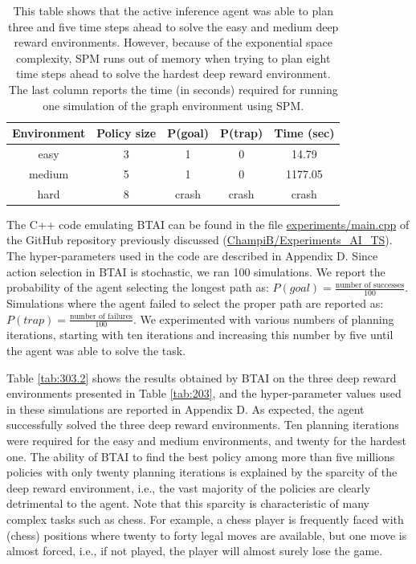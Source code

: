 \documentclass[twoside,11pt]{article}
\begin{document}
\begin{table}[H]
\centering
\begin{tabular}{ |c|c|c|c|c|}
 \hline
 Environment & Policy size & P(goal) & P(trap) & Time (sec)\\
 \hline
 easy & 3 & 1 & 0 & 14.79\\
 medium & 5 & 1 & 0 & 1177.05\\
 hard & 8 & crash & crash & crash \\
 \hline
\end{tabular}
\caption{This table shows that the active inference agent was able to plan three and five time steps ahead to solve the easy and medium deep reward environments. However, because of the exponential space complexity, SPM runs out of memory when trying to plan eight time steps ahead to solve the hardest deep reward environment. The last column reports the time (in seconds) required for running one simulation of the graph environment using SPM.}
\label{tab:303.1}
\end{table}

The C++ code emulating BTAI can be found in the file \url{experiments/main.cpp} of the GitHub repository previously discussed (\url{ChampiB/Experiments_AI_TS}). The hyper-parameters used in the code are described in Appendix D. Since action selection in BTAI is stochastic, we ran 100 simulations. We report the probability of the agent selecting the longest path as: $P(goal) = \frac{\text{number of successes}}{100}$. Simulations where the agent failed to select the proper path are reported as: $P(trap) = \frac{\text{number of failures}}{100}$. We experimented with various numbers of planning iterations, starting with ten iterations and increasing this number by five until the agent was able to solve the task.

Table \ref{tab:303.2} shows the results obtained by BTAI on the three deep reward environments presented in Table \ref{tab:203}, and the hyper-parameter values used in these simulations are reported in Appendix D. As expected, the agent successfully solved the three deep reward environments. Ten planning iterations were required for the easy and medium environments, and twenty for the hardest one. The ability of BTAI to find the best policy among more than five millions policies with only twenty planning iterations is explained by the sparcity of the deep reward environment, i.e., the vast majority of the policies are clearly detrimental to the agent. Note that this sparcity is characteristic of many complex tasks such as chess. For example, a chess player is frequently faced with (chess) positions where twenty to forty legal moves are available, but one move is almost forced, i.e., if not played, the player will almost surely lose the game.
\end{document}

